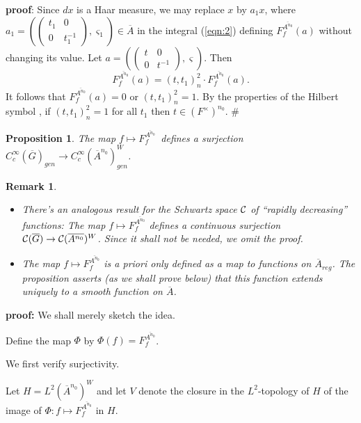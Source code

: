 \documentclass[twocolumn,10pt]{article}
\newtheorem{proposition}[theorem]{Proposition}
\newtheorem{remark}{Remark}
\begin{document}
{\bf proof}: Since $dx$ is a Haar measure, we may replace 
$x$ by $a_1x$, where 
$a_1=(\left( 
\begin{array}{cc}
t_1 & 0 \\ 
0 & t_1^{-1}
\end{array}
\right) ,\varsigma _1)\in \overline{A}$ in the integral
(\ref{eqn:2}) defining $F_f^{\overline{A^{n_0}}}(a)$ without
changing its value. Let 
$a=(\left( 
\begin{array}{cc}
t & 0 \\ 
0 & t^{-1}
\end{array}
\right) ,\varsigma )$. Then 
\[
F_f^{\overline{A^{n_0}}}(a)=(t,t_1)_n^2\cdot F_f^{\overline{A^{n_0}}}(a). 
\]
It follows that $F_f^{\overline{A^{n_0}}}(a)=0$ or $(t,t_1)_n^2=1$. 
By the properties of
the Hilbert symbol \cite{N}, if $(t,t_1)_n^2=1$ for all $t_1$ then
$t\in (F^{\times })^{n_0}$. $\# $

\begin{proposition}
 The map $f\longmapsto F_f^{\overline{A^{n_0}}}$\ defines a surjection
$C_c^\infty (\overline{G})_{gen}\rightarrow
C_c^\infty (\overline{A}^{n_0})_{gen}^W$.
\label{prop:main1}
\end{proposition}

\begin{remark}
\begin{itemize}
\item
There's an analogous result for the Schwartz space ${\cal C}$
of ``rapidly decreasing'' functions: 
 The map $f\longmapsto F_f^{\overline{A^{n_0}}}$ 
defines a continuous
surjection ${\cal C}(\overline{G})\rightarrow
{\cal C}(\overline{A^{n_0}})^W$.
Since it shall not be needed, we omit the proof.
\item
The map $f\longmapsto F_f^{\overline{A^{n_0}}}$
is {\it a priori} only defined as a map to functions on
$\overline{A}_{reg}$. The proposition asserts (as we shall
prove below) that this function extends uniquely to
a smooth function on $\overline{A}$.
\end{itemize}
\end{remark}

{\bf proof:} We shall merely sketch the idea.

Define the map $\Phi$ by $\Phi(f)=F_f^{\overline{A^{n_0}}}$.

We first verify surjectivity.

Let $H=L^2(\overline{A}^{n_0})^W$ and let 
$V$ denote the closure in the $L^2$-topology of $H$
of the image of $\Phi:f\longmapsto F_f^{\overline{A^{n_0}}}$ in $H$.
\end{document}
